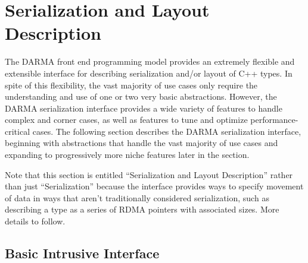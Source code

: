 
\section{Serialization and Layout Description}
\label{sec:serialization}

\lstMakeShortInline[style=CppCodeInlineStyle]{\|}

The DARMA front end programming model provides an extremely flexible and
extensible interface for describing serialization and/or layout of C++ types. 
In spite of this flexibility, the vast majority of use cases only require the
understanding and use of one or two very basic abstractions.  However, the DARMA
serialization interface provides a wide variety of features to handle complex
and corner cases, as well as features to tune and optimize performance-critical
cases.  The following section describes the DARMA serialization interface,
beginning with abstractions that handle the vast majority of use cases and
expanding to progressively more niche features later in the section.

Note that this section is entitled ``Serialization and Layout Description''
rather than just ``Serialization'' because the interface provides ways to
specify movement of data in ways that aren't traditionally considered
serialization, such as describing a type as a series of \gls{RDMA} pointers with
associated sizes.  More details to follow.

\subsection{Basic Intrusive Interface}
\label{ssec:serbasic}

